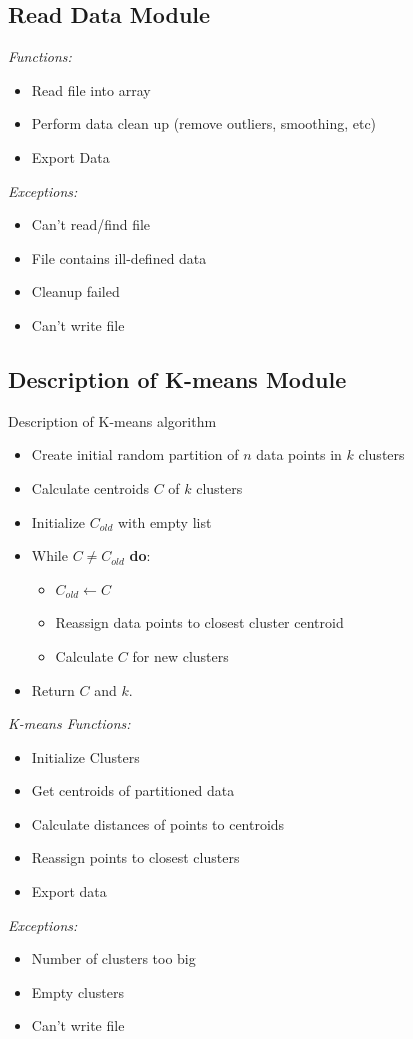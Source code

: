 \documentclass[12pt]{article} %
\begin{document}
\subsection{Read Data Module}
\emph{Functions:}
\begin{itemize}
	\item Read file into array 
	\item Perform data clean up (remove outliers, smoothing, etc)
	\item Export Data 
\end{itemize}

\emph{Exceptions:}
\begin{itemize}
	\item Can't read/find file
	\item File contains ill-defined data 
	\item Cleanup failed
	\item Can't write file 
\end{itemize}


\subsection{Description of K-means Module}
Description of K-means algorithm 

\begin{itemize}
	\item Create initial random partition of $n$ data points in $k$ clusters
	\item Calculate centroids $C$ of $k$ clusters
	\item Initialize $C_{old}$ with empty list 
	\item While $C \neq C_{old}$ \textbf{do}:
		\begin{itemize}
			\item $C_{old} \gets C$
			\item Reassign data points to closest cluster centroid 
			\item Calculate $C$ for new clusters 
		\end{itemize}
	\item Return $C$ and $k.$ 
\end{itemize}

\emph{K-means Functions:}
\begin{itemize}
	\item Initialize Clusters
	\item Get centroids of partitioned data 
	\item Calculate distances of points to centroids 
	\item Reassign points to closest clusters 
	\item Export data 
\end{itemize}
\emph{Exceptions:}
\begin{itemize}
	\item Number of clusters too big 
	\item Empty clusters 
	\item Can't write file 
\end{itemize}
\end{document}
